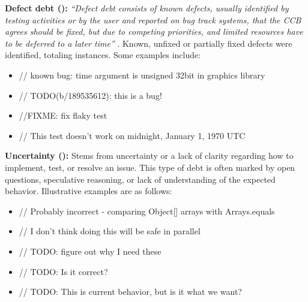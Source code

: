 \textbf{Defect debt ():} \textit{``Defect debt consists of known defects, usually identified by testing activities or by the user and reported on bug track systems, that the CCB agrees should be fixed, but due to competing priorities, and limited resources have to be deferred to a later time''} \cite{alves_towards_2014}. Known, unfixed or partially fixed defects were identified, totaling  instances. Some examples include:
\begin{itemize}[itemsep=-2pt]
    \item \textcolor{commentColor}{// known bug: time argument is unsigned 32bit in graphics library}
    \item \textcolor{commentColor}{// TODO(b/189535612): this is a bug!}
    \item \textcolor{commentColor}{//FIXME: fix flaky test}
    \item \textcolor{commentColor}{// This test doesn't work on midnight, January 1, 1970 UTC}
\end{itemize}

\textbf{Uncertainty (\uncertaintyCount{}):} Stems from uncertainty or a lack of clarity regarding how to implement, test, or resolve an issue. This type of debt is often marked by open questions, speculative reasoning, or lack of understanding of the expected behavior. Illustrative examples are as follows:
\begin{itemize}[itemsep=-2pt]
    \item \textcolor{commentColor}{// Probably incorrect - comparing Object[] arrays with Arrays.equals}
    \item \textcolor{commentColor}{// I don't think doing this will be safe in parallel}
    \item \textcolor{commentColor}{// TODO: figure out why I need these}
    \item \textcolor{commentColor}{// TODO: Is it correct?}
    \item \textcolor{commentColor}{// TODO: This is current behavior, but is it what we want?}
\end{itemize}

